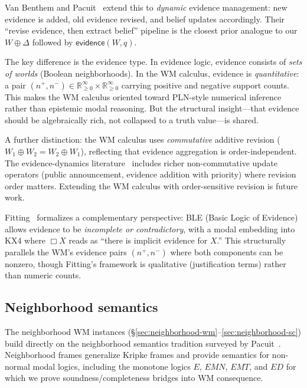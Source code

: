 \documentclass[]{article}
\newcommand{\revise}{\mathbin{\oplus}}
\newcommand{\ev}{\mathsf{evidence}}
\begin{document}
Van Benthem and Pacuit~\cite{vanBenthemPacuit2011} extend this to
\emph{dynamic} evidence management: new evidence is added, old evidence
revised, and belief updates accordingly. Their ``revise evidence, then
extract belief'' pipeline is the closest prior analogue to our
$W \revise \Delta$ followed by $\ev(W,q)$.

The key difference is the evidence type. In evidence logic, evidence
consists of \emph{sets of worlds} (Boolean neighborhoods). In the WM
calculus, evidence is \emph{quantitative}: a pair
$(n^+,n^-)\in\mathbb{R}_{\ge 0}^\infty\times\mathbb{R}_{\ge 0}^\infty$
carrying positive and negative support counts. This makes the WM
calculus oriented toward PLN-style numerical inference rather than
epistemic modal reasoning. But the structural insight---that evidence
should be algebraically rich, not collapsed to a truth value---is shared.

A further distinction: the WM calculus uses \emph{commutative} additive
revision ($W_1 \revise W_2 = W_2 \revise W_1$), reflecting that evidence
aggregation is order-independent. The evidence-dynamics
literature~\cite{vanBenthemPacuit2011} includes richer non-commutative
update operators (public announcement, evidence addition with priority)
where revision order matters. Extending the WM calculus with
order-sensitive revision is future work.

Fitting~\cite{Fitting2017ParaconsistentEvidence} formalizes a
complementary perspective: BLE (Basic Logic of Evidence) allows evidence
to be \emph{incomplete or contradictory}, with a modal embedding into
KX4 where $\Box X$ reads as ``there is implicit evidence for $X$.'' This
structurally parallels the WM's evidence pairs $(n^+,n^-)$ where both
components can be nonzero, though Fitting's framework is qualitative
(justification terms) rather than numeric counts.


\subsection{Neighborhood semantics}

The neighborhood WM instances (\S\ref{sec:neighborhood-wm}--\ref{sec:neighborhood-sc})
build directly on the neighborhood semantics tradition surveyed by
Pacuit~\cite{Pacuit2017NeighborhoodSemantics}. Neighborhood frames
generalize Kripke frames and provide semantics for non-normal modal
logics, including the monotone logics $E$, $\mathit{EMN}$,
$\mathit{EMT}$, and $\mathit{ED}$ for which we prove
soundness/completeness bridges into WM consequence.
\end{document}
